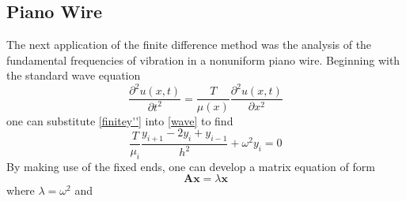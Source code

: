 \documentclass[12pt]{article}
\begin{document}
\subsection{Piano Wire}
The next application of the finite difference method was the analysis of the fundamental frequencies of vibration in a nonuniform piano wire.  Beginning with the standard wave equation
\begin{equation}
\label{wave}
\frac{\partial^2u(x,t)}{\partial t^2}=\frac{T}{\mu(x)} \frac{\partial^2 u(x,t)}{\partial x^2}
\end{equation}
one can substitute \eqref{finitey''} into \eqref{wave} to find
\begin{equation}
\label{wave2}
\frac{T}{\mu_i} \frac{y_{i+1}-2y_i+y_{i-1}}{h^2}+\omega^2 y_i=0
\end{equation}
By making use of the fixed ends, one can develop a matrix equation of form
\begin{equation}
\label{mat}
\mathbf{A x} = \lambda \mathbf{x}
\end{equation}
where $\lambda = \omega^2$ and 
\end{document}
